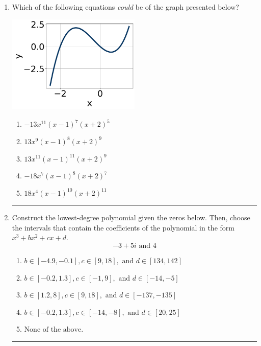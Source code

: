 \documentclass[14pt]{extbook}
\newcommand{\litem}[1]{\item#1\hspace*{-1cm}\rule{\textwidth}{0.4pt}}
\begin{document}
\begin{enumerate}
{\begin{enumerate}[label=\Alph*.]
\end{enumerate} }
\litem{
Which of the following equations \textit{could} be of the graph presented below?
\begin{center}
    \includegraphics[width=0.5\textwidth]{../Figures/polyGraphToFunctionA.png}
\end{center}
\begin{enumerate}[label=\Alph*.]
\item \( -13x^{11} (x - 1)^{7} (x + 2)^{5} \)
\item \( 13x^{9} (x - 1)^{8} (x + 2)^{9} \)
\item \( 13x^{11} (x - 1)^{11} (x + 2)^{9} \)
\item \( -18x^{7} (x - 1)^{8} (x + 2)^{7} \)
\item \( 18x^{4} (x - 1)^{10} (x + 2)^{11} \)

\end{enumerate} }
\litem{
Construct the lowest-degree polynomial given the zeros below. Then, choose the intervals that contain the coefficients of the polynomial in the form $x^3+bx^2+cx+d$.\[ -3 + 5 i \text{ and } 4 \]\begin{enumerate}[label=\Alph*.]
\item \( b \in [-4.9, -0.1], c \in [9, 18], \text{ and } d \in [134, 142] \)
\item \( b \in [-0.2, 1.3], c \in [-1, 9], \text{ and } d \in [-14, -5] \)
\item \( b \in [1.2, 8], c \in [9, 18], \text{ and } d \in [-137, -135] \)
\item \( b \in [-0.2, 1.3], c \in [-14, -8], \text{ and } d \in [20, 25] \)
\item \( \text{None of the above.} \)


\end{enumerate}}
\end{enumerate}
\end{document}
